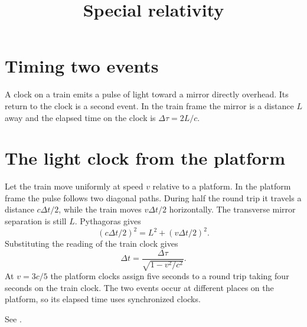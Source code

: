 



\title{
Special relativity}
\maketitle

\tableofcontents

\section{Timing two events}
A clock on a train emits a pulse of light
toward a mirror directly overhead. Its return
to the clock is a second event. In the train
frame the mirror is a distance $L$ away and
the elapsed time on the clock is
$\Delta\tau=2L/c$.

\section{The light clock from the platform}
Let the train move uniformly at speed $v$
relative to a platform. In the platform frame
the pulse follows two diagonal paths. During
half the round trip it travels a distance
$c\Delta t/2$, while the train moves $v\Delta
t/2$ horizontally. The transverse mirror
separation is still $L$. Pythagoras gives
$$
(c\Delta t/2)^2=L^2+(v\Delta t/2)^2.
$$
Substituting the reading of the train clock
gives
$$
\Delta t=
\frac{\Delta\tau}{\sqrt{1-v^2/c^2}}.
$$
At $v=3c/5$ the platform clocks assign five
seconds to a round trip taking four seconds
on the train clock. The two events occur at
different places on the platform, so its
elapsed time uses synchronized clocks.

See \cite[Vol. I, Sections 15-1 to
15-4]{feynman-lectures}.






